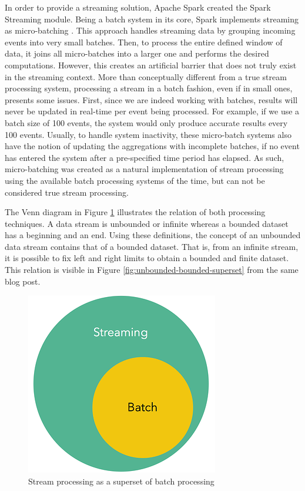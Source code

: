 In order to provide a streaming solution, Apache Spark created the Spark Streaming \cite{SparkStreaming} module. Being a batch system in its core, Spark implements streaming as micro-batching \cite{SparkStreamingPaper}. This approach handles streaming data by grouping incoming events into very small batches. Then, to process the entire defined window of data, it joins all micro-batches into a larger one and performs the desired computations. However, this creates an artificial barrier that does not truly exist in the streaming context. More than conceptually different from a true stream processing system, processing a stream in a batch fashion, even if in small ones, presents some issues. First, since we are indeed working with batches, results will never be updated in real-time per event being processed. For example, if we use a batch size of 100 events, the system would only produce accurate results every 100 events. Usually, to handle system inactivity, these micro-batch systems also have the notion of updating the aggregations with incomplete batches, if no event has entered the system after a pre-specified time period has elapsed. As such, micro-batching was created as a natural implementation of stream processing using the available batch processing systems of the time, but can not be considered true stream processing.

The Venn diagram in Figure \ref{fig:stream-superset} \cite{batch-is-a-special-case-of-streaming} illustrates the relation of both processing techniques. A data stream is unbounded or infinite whereas a bounded dataset has a beginning and an end. Using these definitions, the concept of an unbounded data stream contains that of a bounded dataset. That is, from an infinite stream, it is possible to fix left and right limits to obtain a bounded and finite dataset. This relation is visible in Figure \ref{fig:unbounded-bounded-superset} from the same blog post.

\begin{figure}[!htb]
    \begin{center}
      \includegraphics[scale=0.5]{figures/streaming-subset-batch.png}
      \caption[Stream processing as a superset of batch processing]{Stream processing as a superset of batch processing \cite{batch-is-a-special-case-of-streaming}}
      \label{fig:stream-superset}
    \end{center}
\end{figure}

